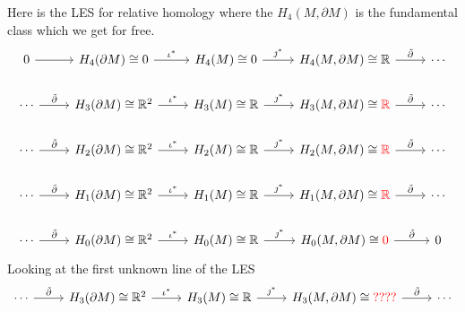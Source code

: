 \documentclass{article}
\begin{document}
Here is the LES for relative homology where the $H_4(M,\partial M)$ is the fundamental class which we get for free.
\[
\begin{tikzcd}
0 \arrow[r]                          & H_4(\partial M)\cong 0 \arrow[r, "\iota^*"]            & H_4(M)\cong 0 \arrow[r, "\jmath^*"]          & {H_4(M,\partial M)\cong \R} \arrow[r, "\tilde{\partial}"]          & \cdots \\
\cdots \arrow[r, "\tilde{\partial}"]                          & H_3(\partial M)\cong \R^2 \arrow[r, "\iota^*"]            & H_3(M)\cong \R \arrow[r, "\jmath^*"]          & {H_3(M,\partial M)\cong \textcolor{red}{\R}} \arrow[r, "\tilde{\partial}"]          & \cdots \\
\cdots \arrow[r, "\tilde{\partial}"] & H_2(\partial M)\cong \mathbb{R}^2 \arrow[r, "\iota^*"]   & H_2(M) \cong \R \arrow[r, "\jmath^*"]         & {H_2(M,\partial M)\cong \textcolor{red}{\R}} \arrow[r, "\tilde{\partial}"] & \cdots \\
\cdots \arrow[r, "\tilde{\partial}"] & H_1(\partial M)\cong \mathbb{R}^2 \arrow[r, "\iota^*"] & H_1(M)\cong \mathbb{R} \arrow[r, "\jmath^*"] & {H_1(M,\partial M)\cong\textcolor{red}{\R}} \arrow[r, "\tilde{\partial}"]          & \cdots \\
\cdots \arrow[r, "\tilde{\partial}"] & H_0(\partial M)\cong \mathbb{R}^2 \arrow[r, "\iota^*"]   & H_0(M)\cong \mathbb{R} \arrow[r, "\jmath^*"] & {H_0(M,\partial M)\cong \textcolor{red}{0}} \arrow[r, "\tilde{\partial}"]          & 0     
\end{tikzcd}
\]
Looking at the first unknown line of the LES 
\[
\begin{tikzcd}
\cdots \arrow[r, "\tilde{\partial}"]                          & H_3(\partial M)\cong \R^2 \arrow[r, "\iota^*"]            & H_3(M)\cong \R \arrow[r, "\jmath^*"]          & {H_3(M,\partial M)\cong \textcolor{red}{????}} \arrow[r, "\tilde{\partial}"]          & \cdots
\end{tikzcd}
\]
\end{document}
